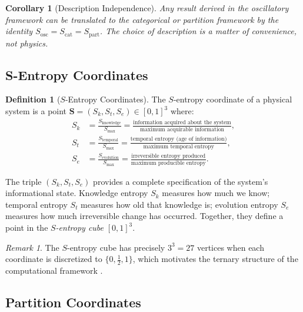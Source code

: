 \documentclass[twocolumn,10pt]{article}
\newtheorem{corollary}[theorem]{Corollary}
\theoremstyle{definition}
\newtheorem{definition}[theorem]{Definition}
\theoremstyle{remark}
\newtheorem{remark}[theorem]{Remark}
\newcommand{\Sk}{S_k}
\newcommand{\St}{S_t}
\newcommand{\Se}{S_e}
\newcommand{\Sosc}{S_{\mathrm{osc}}}
\newcommand{\Scat}{S_{\mathrm{cat}}}
\newcommand{\Spart}{S_{\mathrm{part}}}
\begin{document}
\begin{corollary}[Description Independence]
\label{cor:description_independence}
Any result derived in the oscillatory framework can be translated to the categorical or partition framework by the identity $\Sosc = \Scat = \Spart$. The choice of description is a matter of convenience, not physics.
\end{corollary}

\subsection{S-Entropy Coordinates}

\begin{definition}[$S$-Entropy Coordinates]
\label{def:sentropy}
The $S$-entropy coordinate of a physical system is a point $\mathbf{S} = (\Sk, \St, \Se) \in [0,1]^3$ where:
\begin{align}
  \Sk &= \frac{S_{\mathrm{knowledge}}}{S_{\max}} = \frac{\text{information acquired about the system}}{\text{maximum acquirable information}}, \label{eq:sk} \\
  \St &= \frac{S_{\mathrm{temporal}}}{S_{\max}} = \frac{\text{temporal entropy (age of information)}}{\text{maximum temporal entropy}}, \label{eq:st} \\
  \Se &= \frac{S_{\mathrm{evolution}}}{S_{\max}} = \frac{\text{irreversible entropy produced}}{\text{maximum producible entropy}}. \label{eq:se}
\end{align}
\end{definition}

The triple $(\Sk, \St, \Se)$ provides a complete specification of the system's informational state. Knowledge entropy $\Sk$ measures how much we know; temporal entropy $\St$ measures how old that knowledge is; evolution entropy $\Se$ measures how much irreversible change has occurred. Together, they define a point in the \emph{$S$-entropy cube} $[0,1]^3$.

\begin{remark}
The $S$-entropy cube has precisely $3^3 = 27$ vertices when each coordinate is discretized to $\{0, \tfrac{1}{2}, 1\}$, which motivates the ternary structure of the computational framework \cite{sachikonye2026converter}.
\end{remark}

\subsection{Partition Coordinates}
\end{document}
